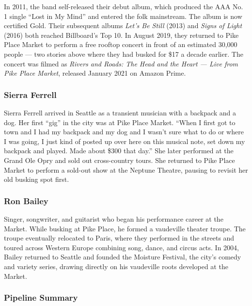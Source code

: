 \documentclass[11pt,letterpaper]{article}
\begin{document}
In 2011, the band self-released their debut album, which produced the AAA No. 1 single ``Lost in My Mind'' and entered the folk mainstream. The album is now certified Gold. Their subsequent albums \textit{Let's Be Still} (2013) and \textit{Signs of Light} (2016) both reached Billboard's Top 10. In August 2019, they returned to Pike Place Market to perform a free rooftop concert in front of an estimated 30,000 people --- two stories above where they had busked for \$17 a decade earlier. The concert was filmed as \textit{Rivers and Roads: The Head and the Heart --- Live from Pike Place Market}, released January 2021 on Amazon Prime.

\subsubsection{Sierra Ferrell}

Sierra Ferrell arrived in Seattle as a transient musician with a backpack and a dog. Her first ``gig'' in the city was at Pike Place Market. ``When I first got to town and I had my backpack and my dog and I wasn't sure what to do or where I was going, I just kind of posted up over here on this musical note, set down my backpack and played. Made about \$300 that day.'' She later performed at the Grand Ole Opry and sold out cross-country tours. She returned to Pike Place Market to perform a sold-out show at the Neptune Theatre, pausing to revisit her old busking spot first.

\subsubsection{Ron Bailey}

Singer, songwriter, and guitarist who began his performance career at the Market. While busking at Pike Place, he formed a vaudeville theater troupe. The troupe eventually relocated to Paris, where they performed in the streets and toured across Western Europe combining song, dance, and circus acts. In 2004, Bailey returned to Seattle and founded the Moisture Festival, the city's comedy and variety series, drawing directly on his vaudeville roots developed at the Market.

\subsubsection{Pipeline Summary}
\end{document}
